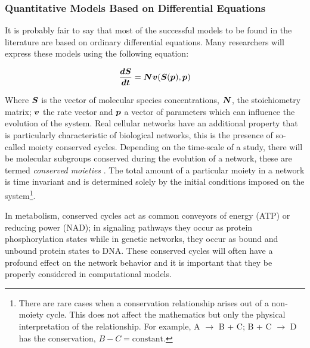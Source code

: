 \documentclass[]{article}
\begin{document}
\subsubsection{Quantitative Models Based on Differential Equations}

It is probably fair to say that most of the successful models to be
found in the literature are based on ordinary differential equations.
Many researchers will express these models using the following equation:

\begin{equation} \label{eq:system}
        \frac{\mbox{\boldmath $dS$}}{\mbox{\boldmath $dt$}} = \mbox{\boldmath $N$} \mbox{\boldmath $v$} (\mbox{\boldmath $S$} (\mbox{\boldmath $p$}), \mbox{\boldmath $p$})
\end{equation}

Where $\mbox{\boldmath $S$}$ is the vector of molecular species concentrations, $\mbox{\boldmath $N$}$,
the stoichiometry matrix; $\mbox{\boldmath $v$}$ the rate vector and $\mbox{\boldmath $p$}$ a vector of
parameters which can influence the evolution of the system. Real
cellular networks have an additional property that is particularly
characteristic of biological networks, this is the presence of so-called
moiety conserved cycles. Depending on the time-scale of a study, there
will be molecular subgroups conserved during the evolution of a network,
these are termed \emph{conserved moieties} \autocite{Re81}. The total
amount of a particular moiety in a network is time invariant and is
determined solely by the initial conditions imposed on the
system\footnote{There are rare cases when a conservation relationship
  arises out of a non-moiety cycle. This does not affect the mathematics
  but only the physical interpretation of the relationship. For example,
  A $\rightarrow$ B + C; B + C $\rightarrow$ D has the conservation,
  $B - C =\mbox{constant}$.}.

In metabolism, conserved cycles act as common conveyors of energy (ATP)
or reducing power (NAD); in signaling pathways they occur as protein
phosphorylation states while in genetic networks, they occur as bound
and unbound protein states to DNA. These conserved cycles will often
have a profound effect on the network behavior and it is important that
they be properly considered in computational models.
\end{document}
